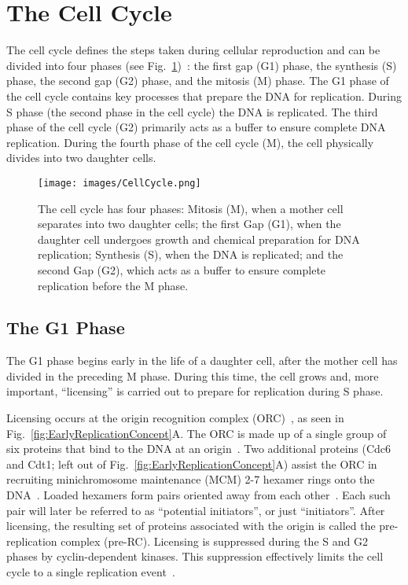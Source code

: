 	\section{The Cell Cycle}
	\label{sec:CellCycle}
	
	The cell cycle defines the steps taken during cellular reproduction and can be divided into four phases (see Fig.~\ref{fig:CellCycle})~\cite{MolecularCellBiology,CellMolApproach}:
	the first gap (G1) phase, the synthesis (S) phase, the second gap (G2) phase, and the mitosis (M) phase.
	The G1 phase of the cell cycle contains key processes that prepare the DNA for replication.
	During S phase (the second phase in the cell cycle) the DNA is replicated.
	The third phase of the cell cycle (G2) primarily acts as a buffer to ensure complete DNA replication.
	During the fourth phase of the cell cycle (M), the cell physically divides into two daughter cells.
	
	\begin{figure}[thb]
		\begin{center}
			\texttt{[image: images/CellCycle.png]}
		\end{center}
			\caption[The Four Phases of the Cell Cycle]{\label{fig:CellCycle} The cell cycle has four phases: 
				Mitosis (M), when a mother cell separates into two daughter cells; 
				the first Gap (G1), when the daughter cell undergoes growth and chemical preparation for DNA replication;
				Synthesis (S), when the DNA is replicated;
				and the second Gap (G2), which acts as a buffer to ensure complete replication before the M phase.}
	\end{figure}
	
	
		\subsection{The G1 Phase}
		\label{subsec:G1Phase}
		
		The G1 phase begins early in the life of a daughter cell, after the mother cell has divided in the preceding M phase.
		During this time, the cell grows and, more important, ``licensing'' is carried out to prepare for replication during S phase.
		
		Licensing occurs at the origin recognition complex (ORC)~\cite{DNAInitiation}, as seen in Fig.~\ref{fig:EarlyReplicationConcept}A.
		The ORC is made up of a single group of six proteins that bind to the DNA at an origin~\cite{ORC}.
		Two additional proteins (Cdc6 and Cdt1; left out of Fig.~\ref{fig:EarlyReplicationConcept}A) assist the ORC in recruiting minichromosome maintenance (MCM) 2-7 hexamer rings onto the DNA~\cite{DNARepInitiation}.
		Loaded hexamers form pairs oriented away from each other~\cite{MCMPairs}.
		Each such pair will later be referred to as ``potential initiators'', or just ``initiators''.
		After licensing, the resulting set of proteins associated with the origin is called the pre-replication complex (pre-RC).
		Licensing is suppressed during the S and G2 phases by cyclin-dependent kinases.
		This suppression effectively limits the cell cycle to a single replication event~\cite{MolecularCellBiology}.
		
